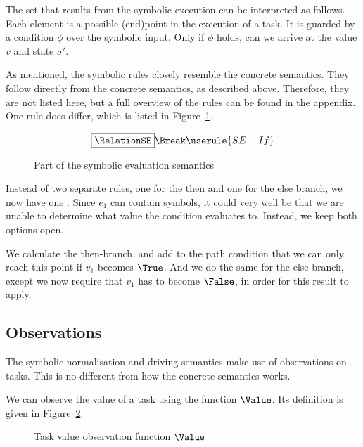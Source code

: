 The set that results from the symbolic execution can be interpreted as follows.
Each element is a possible (end)point in the execution of a task.
It is guarded by a condition $\phi$ over the symbolic input.
Only if $\phi$ holds, can we arrive at the value $v$ and state $\sigma'$.

As mentioned, the symbolic rules closely resemble the concrete semantics.
They follow directly from the concrete semantics, as described above.
Therefore, they are not listed here, but a full overview of the rules can be found in the appendix.
One rule does differ, which is listed in Figure~\ref{fig:eval}.

\begin{figure}[h]
  \small
  \begin{gather*}
    \boxed{\RelationSE} \Break
    \userule{SE-If}
  \end{gather*}
  \caption{Part of the symbolic evaluation semantics}
  \label{fig:eval}
\end{figure}

Instead of two separate rules, one for the then and one for the else branch, we now have one .
Since $e_1$ can contain symbols, it could very well be that we are unable to determine what value the condition evaluates to.
Instead, we keep both options open.

We calculate the then-branch, and add to the path condition that we can only reach this point if $v_1$ becomes $\True$.
And we do the same for the else-branch, except we now require that $v_1$ has to become $\False$, in order for this result to apply.

\subsection{Observations}
\label{subsec:observations}
The symbolic normalisation and driving semantics make use of observations on tasks.
This is no different from how the concrete \TOPHAT semantics works.

We can observe the value of a task using the function $\Value$.
Its definition is given in Figure~\ref{fig:value}.

\begin{figure}[h]
  \small
  \begin{center}
  \end{center}
  \caption{Task value observation function $\Value$}
  \label{fig:value}
\end{figure}

